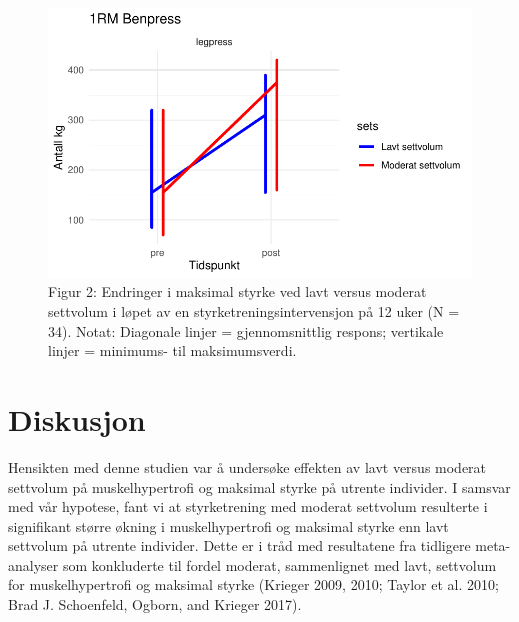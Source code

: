 \documentclass[
  letterpaper,
  DIV=11,
  numbers=noendperiod]{scrreprt}
\begin{document}
\begin{figure}

{\centering \includegraphics{05-analyse_av_repeterte_forsok_files/figure-pdf/Figur 2-1.pdf}

}

\caption{Figur 2: Endringer i maksimal styrke ved lavt versus moderat
settvolum i løpet av en styrketreningsintervensjon på 12 uker (N = 34).
Notat: Diagonale linjer = gjennomsnittlig respons; vertikale linjer =
minimums- til maksimumsverdi.}

\end{figure}

\hypertarget{diskusjon-1}{%
\section{Diskusjon}\label{diskusjon-1}}

Hensikten med denne studien var å undersøke effekten av lavt versus
moderat settvolum på muskelhypertrofi og maksimal styrke på utrente
individer. I samsvar med vår hypotese, fant vi at styrketrening med
moderat settvolum resulterte i signifikant større økning i
muskelhypertrofi og maksimal styrke enn lavt settvolum på utrente
individer. Dette er i tråd med resultatene fra tidligere meta-analyser
som konkluderte til fordel moderat, sammenlignet med lavt, settvolum for
muskelhypertrofi og maksimal styrke (Krieger 2009, 2010; Taylor et al.
2010; Brad J. Schoenfeld, Ogborn, and Krieger 2017).
\end{document}
